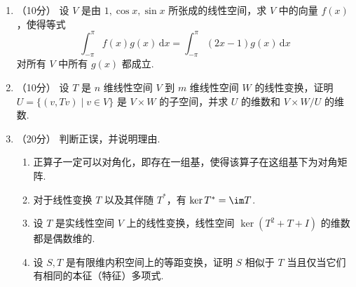 \begin{enumerate}
    \item （10分）
    设 $V$ 是由 $1, \cos x, \sin x$ 所张成的线性空间，求 $V$ 中的向量 $f(x)$，使得等式
    \[
    \int_{-\pi}^{\pi} f(x)g(x) \, \mathrm{d}x = \int_{-\pi}^{\pi} (2x-1)g(x) \, \mathrm{d}x
    \]
    对所有 $V$ 中所有 $g(x)$ 都成立.

    \item （10分）
    设 $T$ 是 $n$ 维线性空间 $V$ 到 $m$ 维线性空间 $W$ 的线性变换，证明 $U = \{(v,Tv) \mid v \in V\}$ 是 $V \times W$ 的子空间，并求 $U$ 的维数和 $V \times W/U$ 的维数.

    \item （20分）
    判断正误，并说明理由.
    \begin{enumerate}
        \item 正算子一定可以对角化，即存在一组基，使得该算子在这组基下为对角矩阵.

        \item 对于线性变换 $T$ 以及其伴随 $T^*$，有 $\ker T^* = \im T$.

        \item 设 $T$ 是实线性空间 $V$ 上的线性变换，线性空间 $\ker(T^2 + T + I)$ 的维数都是偶数维的.

        \item 设 $S,T$ 是有限维内积空间上的等距变换，证明 $S$ 相似于 $T$ 当且仅当它们有相同的本征（特征）多项式.
    \end{enumerate}
\end{enumerate}

\clearpage
